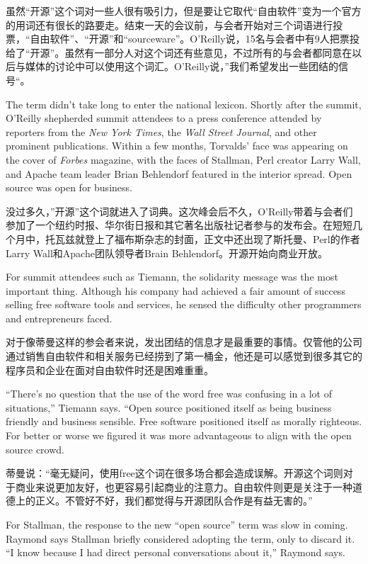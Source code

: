\ifdefined\chs
虽然``开源''这个词对一些人很有吸引力，但是要让它取代``自由软件''变为一个官方的用词还有很长的路要走。结束一天的会议前，与会者开始对三个词语进行投票，``自由软件''、``开源''和``sourceware''。O'Reilly说，15名与会者中有9人把票投给了``开源''。虽然有一部分人对这个词还有些意见，不过所有的与会者都同意在以后与媒体的讨论中可以使用这个词汇。O'Reilly说，''我们希望发出一些团结的信号``。
\fi

\ifdefined\eng
The term didn't take long to enter the national lexicon. Shortly after the summit, O'Reilly shepherded summit attendees to a press conference attended by reporters from the \textit{New York Times}, the \textit{Wall Street Journal}, and other prominent publications. Within a few months, Torvalds' face was appearing on the cover of \textit{Forbes} magazine, with the faces of Stallman, Perl creator Larry Wall, and Apache team leader Brian Behlendorf featured in the interior spread. Open source was open for business.
\fi

\ifdefined\chs
没过多久，''开源''这个词就进入了词典。这次峰会后不久，O'Reilly带着与会者们参加了一个纽约时报、华尔街日报和其它著名出版社记者参与的发布会。在短短几个月中，托瓦兹就登上了福布斯杂志的封面，正文中还出现了斯托曼、Perl的作者Larry Wall和Apache团队领导者Brain Behlendorf。开源开始向商业开放。
\fi

\ifdefined\eng
For summit attendees such as Tiemann, the solidarity message was the most important thing. Although his company had achieved a fair amount of success selling free software tools and services, he sensed the difficulty other programmers and entrepreneurs faced.
\fi

\ifdefined\chs
对于像蒂曼这样的参会者来说，发出团结的信息才是最重要的事情。仅管他的公司通过销售自由软件和相关服务已经捞到了第一桶金，他还是可以感觉到很多其它的程序员和企业在面对自由软件时还是困难重重。
\fi

\ifdefined\eng
``There's no question that the use of the word free was confusing in a lot of situations,'' Tiemann says. ``Open source positioned itself as being business friendly and business sensible. Free software positioned itself as morally righteous. For better or worse we figured it was more advantageous to align with the open source crowd.
\fi

\ifdefined\chs
蒂曼说：``毫无疑问，使用free这个词在很多场合都会造成误解。开源这个词则对于商业来说更加友好，也更容易引起商业的注意力。自由软件则更是关注于一种道德上的正义。不管好不好，我们都觉得与开源团队合作是有益无害的。''
\fi

\ifdefined\eng
For Stallman, the response to the new ``open source'' term was slow in coming. Raymond says Stallman briefly considered adopting the term, only to discard it. ``I know because I had direct personal conversations about it,'' Raymond says.
\fi

